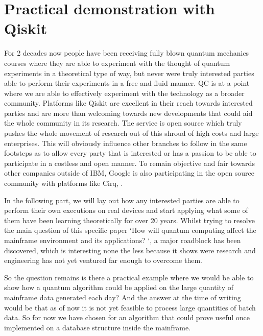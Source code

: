 
\chapter{Practical demonstration with Qiskit}
\label{ch:practical}

For 2 decades now people have been receiving fully blown quantum mechanics courses where they are able to experiment with the thought of quantum experiments in a theoretical type of way, but never were truly interested parties able to perform their experiments in a free and fluid manner. QC is at a point where we are able to effectively experiment with the technology as a broader community. Platforms like Qiskit are excellent in their reach towards interested parties and are more than welcoming towards new developments that could aid the whole community in its research. The service is open source which truly pushes the whole movement of research out of this shroud of high costs and large enterprises. This will obviously influence other branches to follow in the same footsteps as to allow every party that is interested or has a passion to be able to participate in a costless and open manner. To remain objective and fair towards other companies outside of IBM, Google is also participating in the open source community with platforms like Cirq, \textcite{Cirq}. 

In the following part, we will lay out how any interested parties are able to perform their own executions on real devices and start applying what some of them have been learning theoretically for over 20 years. Whilst trying to resolve the main question of this specific paper `How will quantum computing affect the mainframe environment and its applications? `, a major roadblock has been discovered, which is interesting none the less because it shows were research and engineering has not yet ventured far enough to overcome them. 

So the question remains is there a practical example where we would be able to show how a quantum algorithm could be applied on the large quantity of mainframe data generated each day? And the answer at the time of writing would be that as of now it is not yet feasible to process large quantities of batch data. So for now we have chosen for an algorithm that could prove useful once implemented on a database structure inside the mainframe.

